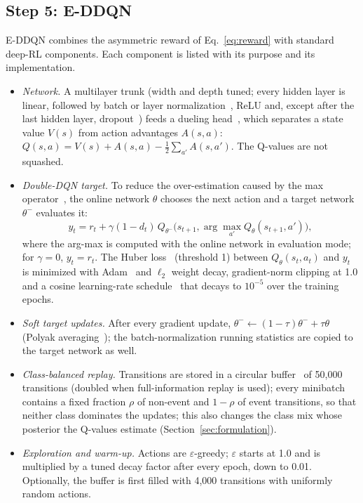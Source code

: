 \subsection{Step 5: E-DDQN}
\label{sec:eddqn}
E-DDQN combines the asymmetric reward of Eq.~\eqref{eq:reward} with standard deep-RL components. Each component is listed with its purpose and its implementation.
\begin{itemize}
\item \emph{Network.} A multilayer trunk (width and depth tuned; every hidden layer is linear, followed by batch or layer normalization~\cite{ioffe2015bn}, ReLU and, except after the last hidden layer, dropout~\cite{srivastava2014dropout}) feeds a dueling head~\cite{wang2016dueling}, which separates a state value $V(s)$ from action advantages $A(s,a)$: $Q(s,a)=V(s)+A(s,a)-\frac{1}{2}\sum_{a'}A(s,a')$. The Q-values are not squashed.
\item \emph{Double-DQN target.} To reduce the over-estimation caused by the max operator~\cite{vanhasselt2016double}, the online network $\theta$ chooses the next action and a target network $\theta^-$ evaluates it:
\begin{equation}
y_t=r_t+\gamma(1-d_t)\,Q_{\theta^-}\big(s_{t+1},\arg\max_{a'}Q_\theta(s_{t+1},a')\big),
\label{eq:ddqn}
\end{equation}
where the arg-max is computed with the online network in evaluation mode; for $\gamma=0$, $y_t=r_t$. The Huber loss~\cite{huber1964robust,girshick2015fast} (threshold 1) between $Q_\theta(s_t,a_t)$ and $y_t$ is minimized with Adam~\cite{kingma2015adam} and $\ell_2$ weight decay, gradient-norm clipping at 1.0 and a cosine learning-rate schedule~\cite{loshchilov2017sgdr} that decays to $10^{-5}$ over the training epochs.
\item \emph{Soft target updates.} After every gradient update, $\theta^-\leftarrow(1-\tau)\theta^-+\tau\theta$ (Polyak averaging~\cite{lillicrap2016continuous}); the batch-normalization running statistics are copied to the target network as well.
\item \emph{Class-balanced replay.} Transitions are stored in a circular buffer~\cite{lin1992selfimproving} of 50,000 transitions (doubled when full-information replay is used); every minibatch contains a fixed fraction $\rho$ of non-event and $1-\rho$ of event transitions, so that neither class dominates the updates; this also changes the class mix whose posterior the Q-values estimate (Section~\ref{sec:formulation}).
\item \emph{Exploration and warm-up.} Actions are $\varepsilon$-greedy; $\varepsilon$ starts at 1.0 and is multiplied by a tuned decay factor after every epoch, down to 0.01. Optionally, the buffer is first filled with 4,000 transitions with uniformly random actions.

\end{itemize}
